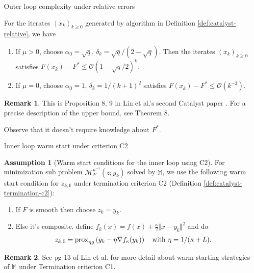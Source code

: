 \documentclass[11pt]{beamer}
\theoremstyle{definition}
\newtheorem{remark}{Remark}[section]
\newtheorem{assumption}{Assumption}[section]
\begin{document}
        \begin{frame}{Outer loop complexity under relative errors}
            \begin{theorem}\label{thm:catalyst2-outer-comp}
                For the iterates $(x_k)_{k \ge 0}$ generated by algorithm in Definition \ref{def:catalyst-relative}, we have 
                \begin{enumerate}
                    \item If $\mu > 0$, choose $\alpha_0 = \sqrt{q}$, $\delta_k = \sqrt{q}/(2 - \sqrt{q})$. 
                    Then the iterates $(x_k)_{k \ge 0}$ satisfies $F(x_k) - F^* \le \mathcal O\left(1 - \sqrt{q}/2\right)^k$. 
                    \item If $\mu = 0$, choose $\alpha_0 = 1$, $\delta_k = 1/(k + 1)^2$ satisfies $F(x_k) - F^* \le \mathcal O(k^{-2})$. 
                \end{enumerate}
            \end{theorem}
            \begin{remark}
                This is Proposition 8, 9 in Lin et al.'s second Catalyst paper \cite{lin_catalyst_2018}.
                For a precise description of the upper bound, see Theorem 8. 
            \end{remark}
            Observe that it doesn't require knowledge about $F^*$. 
        \end{frame}
        \begin{frame}{Inner loop warm start under criterion C2}
            \begin{assumption}[Warm start conditions for the inner loop using C2]\label{ass:warm-start-c2}
                For minimization sub problem $\mathcal M^{\kappa^{-1}}_F(z; y_k)$ solved by $\mathbb M$, we use the following warm start condition for $z_{k, 0}$ under termination criterion C2 (Definition \ref{def:catalyst-termination-c2}): 
                \begin{enumerate}
                    \item If $F$ is smooth then choose $z_k = y_k$. 
                    \item Else it's composite, define $f_k(x) = f(x) + \frac{\kappa}{2}\Vert x - y_k\Vert^2$ and do 
                    \begin{align*}
                        z_{k, 0} = \operatorname{prox}_{\eta g}\left(
                            y_k - \eta\nabla f_\kappa(y_k)
                        \right) \quad \text{with } \eta = 1/(\kappa + L). 
                    \end{align*}
                \end{enumerate}
            \end{assumption}
            \begin{remark}
                See pg 13 of Lin et al. for more detail about warm starting strategies of $\mathbb M$ under Termination criterion C1. 
            \end{remark}
        \end{frame}
\end{document}
